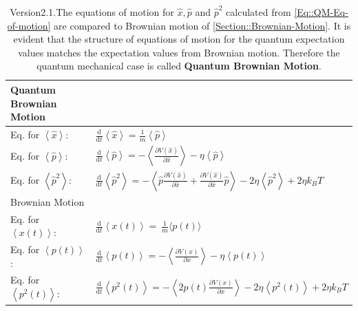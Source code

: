 	\begin{table}[h]
		\centering
		\caption{Version2.1.The equations of motion for  $\hat{x}, \hat{p}$ and $\hat{p}^2$ calculated from  \autoref{Eq::QM-Eq-of-motion} are compared to Brownian motion of \autoref{Section::Brownian-Motion}. It is evident that the structure of equations of motion for the quantum expectation values matches the expectation values from Brownian motion. Therefore the quantum mechanical case is called \textbf{Quantum Brownian Motion}.}
		\begin{tabular}{l l}
			\toprule
			Quantum Brownian Motion  & $\quad$ $\quad$ \\
			\midrule
			Eq. for $\left \langle \hat{x} \right \rangle$: & $\frac{\text{d}}{\text{d}t} \left \langle \hat{x} \right \rangle =	\frac{1}{m} \left\langle \hat{p} \right \rangle$ \\
			Eq. for $\left \langle \hat{p} \right \rangle$: & $\frac{\text{d}}{\text{d}t} \left \langle \hat{p} \right \rangle = - 	\left\langle  \frac{\partial V(\hat{x})}{\partial \hat{x}} \right \rangle - \eta \left \langle \hat{p} \right \rangle$ \\
			Eq. for $\left \langle \hat{p}^2 \right \rangle$: & $\frac{\text{d}}{\text{d}t} \left \langle \hat{p}^2 \right \rangle =	- \left\langle \hat{p} \frac{\partial V(\hat{x})}{\partial \hat{x}} + \frac{\partial V(\hat{x})}{\partial \hat{x}} \hat{p} \right \rangle- 2 \eta \left \langle \hat{p}^2 \right \rangle + 2 \eta k_B T$  \\
			\midrule
			Brownian Motion  & $\quad$ $\quad$ \\
			\midrule
			Eq. for $\left \langle {x}(t) \right \rangle$: & $\frac{\text{d}}{\text{d}t} \left \langle {x}(t) \right \rangle  =	~\frac{1}{m} \langle {p}(t) \rangle $ \\
			Eq. for $\left \langle {p}(t) \right \rangle$: & $\frac{\text{d}}{\text{d}t} \left \langle {p}(t) \right \rangle =	- 	\left \langle \frac{\partial V({x})}{\partial {x}} \right \rangle - \eta \left \langle {p}(t) \right \rangle$ \\
			Eq. for $\left \langle {p}^2(t) \right \rangle$: & $\frac{\text{d}}{\text{d}t} \left \langle {p}^2(t) \right \rangle = - \left\langle 2 {p}(t) \frac{\partial V({x})}{\partial {x}}\right \rangle - 2 \eta \left \langle {p}^2(t) \right \rangle + 2 \eta k_B T$   \\
			\bottomrule
		\end{tabular}
		\label{Table::QBM-vs-BM}
	\end{table}
